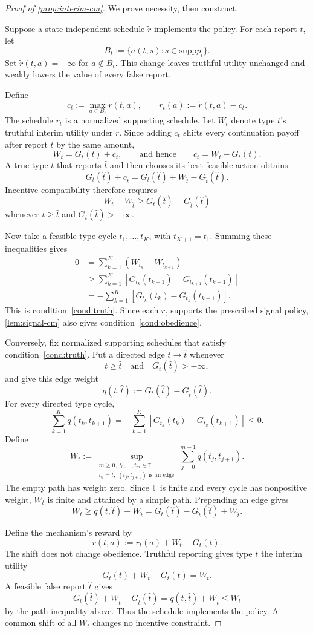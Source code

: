 \documentclass[12pt,reqno]{article}
\newcommand{\supp}{\mathrm{supp}}
\theoremstyle{definition} \newtheorem{example}{Example}
\theoremstyle{definition} \newtheorem{condition}{Condition}
\theoremstyle{definition} \newtheorem{corollary}{Corollary}
\theoremstyle{definition} \newtheorem{claim}{Claim}
\theoremstyle{definition} \newtheorem{definition}{Definition}
\theoremstyle{definition} \newtheorem{conjecture}{Conjecture}
\theoremstyle{definition} \newtheorem{Lemma}{Lemma}
\theoremstyle{definition} \newtheorem{lemma}{Lemma}
\theoremstyle{plain} \newtheorem{theorem}{Theorem}
\theoremstyle{definition} \newtheorem{assumption}{Assumption}
\theoremstyle{definition} \newtheorem*{assumptionnonumber}{Assumption}
\theoremstyle{definition} \newtheorem*{theoremNoNumber}{Proposition}
\theoremstyle{definition}\newtheorem{proposition}{Proposition}
\theoremstyle{definition} \newtheorem{observation}{Observation}
\theoremstyle{definition} \newtheorem*{definitionNoNumber}{Definition}
\theoremstyle{definition} \newtheorem{Definition}{Definition}
\theoremstyle{definition} \newtheorem*{DefinitionNoNumber}{Definition}
\theoremstyle{definition} \newtheorem*{fact}{Fact}
\theoremstyle{definition} \newtheorem*{property}{Property}
\theoremstyle{definition} \newtheorem{remark}{Remark}
\theoremstyle{definition}\newtheorem{romanexampleinner}{Example}
\begin{document}
\begin{proof}[Proof of \cref{prop:interim-cm}]
We prove necessity, then construct.

Suppose a state-independent schedule $\widetilde r$ implements the policy.
For each report $t$, let
\[
B_t:=\{a(t,s):s\in\supp p_t\}.
\]
Set $\widetilde r(t,a)=-\infty$ for $a\notin B_t$. This change leaves
truthful utility unchanged and weakly lowers the value of every false
report.

Define
\[
c_t:=\max_{a\in B_t}\widetilde r(t,a),
\qquad
r_t(a):=\widetilde r(t,a)-c_t.
\]
The schedule $r_t$ is a normalized supporting schedule. Let $W_t$
denote type $t$'s truthful interim utility under $\widetilde r$. Since
adding $c_t$ shifts every continuation payoff after report $t$ by the
same amount,
\[
W_t=G_t(t)+c_t,
\qquad\text{and hence}\qquad
c_t=W_t-G_t(t).
\]
A true type $t$ that reports $\hat t$ and then chooses its best feasible
action obtains
\[
G_t(\hat t)+c_{\hat t}
=
G_t(\hat t)+W_{\hat t}-G_{\hat t}(\hat t).
\]
Incentive compatibility therefore requires
\[
W_t-W_{\hat t}
\geq
G_t(\hat t)-G_{\hat t}(\hat t)
\]
whenever $t\trianglerighteq\hat t$ and $G_t(\hat t)>-\infty$.

Now take a feasible type cycle $t_1,\ldots,t_K$, with
$t_{K+1}=t_1$. Summing these inequalities gives
\[
\begin{aligned}
0
&=
\sum_{k=1}^K(W_{t_k}-W_{t_{k+1}})\\
&\geq
\sum_{k=1}^K
\left[
G_{t_k}(t_{k+1})-G_{t_{k+1}}(t_{k+1})
\right]\\
&=
-\sum_{k=1}^K
\left[
G_{t_k}(t_k)-G_{t_k}(t_{k+1})
\right].
\end{aligned}
\]
This is condition~\eqref{cond:truth}. Since each $r_t$ supports the
prescribed signal policy, \cref{lem:signal-cm} also gives
condition~\eqref{cond:obedience}.

Conversely, fix normalized supporting schedules that satisfy
condition~\eqref{cond:truth}. Put a directed edge $t\to\hat t$ whenever
\[
t\trianglerighteq\hat t
\quad\text{and}\quad
G_t(\hat t)>-\infty,
\]
and give this edge weight
\[
q(t,\hat t):=G_t(\hat t)-G_{\hat t}(\hat t).
\]
For every directed type cycle,
\[
\sum_{k=1}^K q(t_k,t_{k+1})
=
-\sum_{k=1}^K
\left[
G_{t_k}(t_k)-G_{t_k}(t_{k+1})
\right]
\leq0.
\]
Define
\[
W_t
:=
\sup_{\substack{m\geq0,\;t_0,\ldots,t_m\in\mathbb T\\
t_0=t,\;(t_j,t_{j+1})\text{ is an edge}}}
\sum_{j=0}^{m-1}q(t_j,t_{j+1}).
\]
The empty path has weight zero. Since $\mathbb T$ is finite and every
cycle has nonpositive weight, $W_t$ is finite and attained by a simple
path. Prepending an edge gives
\[
W_t
\geq
q(t,\hat t)+W_{\hat t}
=
G_t(\hat t)-G_{\hat t}(\hat t)+W_{\hat t}.
\]

Define the mechanism's reward by
\[
r(t,a):=r_t(a)+W_t-G_t(t).
\]
The shift does not change obedience. Truthful reporting gives type $t$
the interim utility
\[
G_t(t)+W_t-G_t(t)=W_t.
\]
A feasible false report $\hat t$ gives
\[
G_t(\hat t)+W_{\hat t}-G_{\hat t}(\hat t)
=
q(t,\hat t)+W_{\hat t}
\leq W_t
\]
by the path inequality above. Thus the schedule implements the policy.
A common shift of all $W_t$ changes no incentive constraint.
\end{proof}
\end{document}
